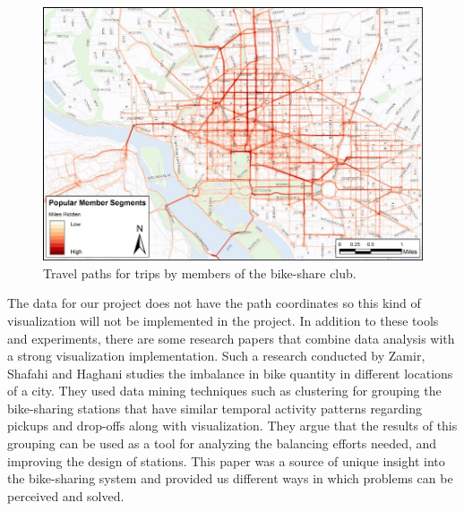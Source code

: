 \newline
\begin{figure}[h]
	\centering %
	\includegraphics[scale=0.8]{figs/Member-segments.jpg}
	\caption{\footnotesize{Travel paths for trips by members of the bike-share club. \cite{MobilityLab}}}
	\label{fig:Path Chart}
	\captionsetup{justification=centering,margin=1cm}
	\vspace{-10pt}
\end{figure}
\newline
The data for our project does not have the path coordinates so this kind of visualization will not be implemented in the project. In addition to these tools and experiments, there are some research papers that combine data analysis with a strong visualization implementation. Such a research conducted by Zamir, Shafahi and Haghani \cite{shafahi:2017:UVBSDB} studies the imbalance in bike quantity in different locations of a city. They used data mining techniques such as clustering for grouping the bike-sharing stations that have similar temporal activity patterns regarding pickups and drop-offs along with visualization. They argue that the results of this grouping can be used as a tool for analyzing the balancing efforts needed, and improving the design of stations. This paper was a source of unique insight into the bike-sharing system and provided us different ways in which problems can be perceived and solved.
